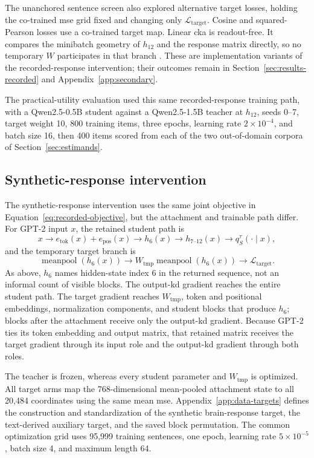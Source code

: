 The unanchored sentence screen also explored alternative target losses, holding the co-trained \ac{mse} grid fixed and changing only \(\mathcal L_{\mathrm{target}}\).
Cosine and squared-Pearson losses use a co-trained target map.
Linear \ac{cka} is readout-free.
It compares the minibatch geometry of \(h_{12}\) and the response matrix directly, so no temporary \(W\) participates in that branch \autocite{kornblith2019}.
These are implementation variants of the recorded-response intervention; their outcomes remain in Section~\ref{sec:results-recorded} and Appendix~\ref{app:secondary}. 

The practical-utility evaluation used this same recorded-response training path, with a Qwen2.5-0.5B student against a Qwen2.5-1.5B teacher at \(h_{12}\), seeds 0--7, target weight 10, 800 training items, three epochs, learning rate \(2\times10^{-4}\), and batch size 16, then 400 items scored from each of the two out-of-domain corpora of Section~\ref{sec:estimands}. 

\subsection{Synthetic-response intervention}

The synthetic-response intervention uses the same joint objective in Equation~\ref{eq:recorded-objective}, but the attachment and trainable path differ.
For GPT-2 input \(x\), the retained student path is
\[
  x
  \longrightarrow e_{\mathrm{tok}}(x)+e_{\mathrm{pos}}(x)
  \longrightarrow h_6(x)
  \longrightarrow h_{7\text{--}12}(x)
  \longrightarrow q_S^\tau(\cdot\mid x),
\]
and the temporary target branch is
\[
  \operatorname{meanpool}\!\left(h_6(x)\right)
  \longrightarrow
  W_{\mathrm{tmp}}\operatorname{meanpool}\!\left(h_6(x)\right)
  \longrightarrow
  \mathcal L_{\mathrm{target}}.
\]
As above, \(h_6\) names hidden-state index 6 in the returned sequence, not an informal count of visible blocks.
The output-\ac{kd} gradient reaches the entire student path.
The target gradient reaches \(W_{\mathrm{tmp}}\), token and positional embeddings, normalization components, and student blocks that produce \(h_6\); blocks after the attachment receive only the output-\ac{kd} gradient.
Because GPT-2 ties its token embedding and output matrix, that retained matrix receives the target gradient through its input role and the output-\ac{kd} gradient through both roles. 

The teacher is frozen, whereas every student parameter and \(W_{\mathrm{tmp}}\) is optimized.
All target arms map the 768-dimensional mean-pooled attachment state to all 20,484 coordinates using the same mean \ac{mse}.
Appendix~\ref{app:data-targets} defines the construction and standardization of the synthetic brain-response target, the text-derived auxiliary target, and the saved block permutation.
The common optimization grid uses 95,999 training sentences, one epoch, learning rate \(5\times10^{-5}\), batch size 4, and maximum length 64. 

